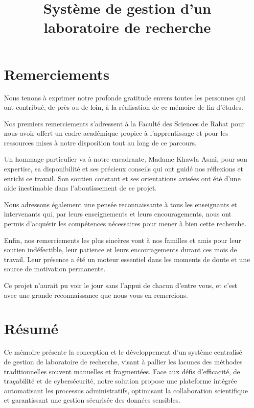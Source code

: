 \documentclass{rapportPfe}
\title{Système de gestion d'un laboratoire de recherche}
\begin{document}

\fairemarges
\fairepagedegarde


\chapter*{Remerciements}
Nous tenons à exprimer notre profonde gratitude envers toutes les personnes qui ont contribué, de près ou de loin, à la réalisation de ce mémoire de fin d’études.

Nos premiers remerciements s’adressent à la Faculté des Sciences de Rabat pour nous avoir offert un cadre académique propice à l’apprentissage et pour les ressources mises à notre disposition tout au long de ce parcours.

Un hommage particulier va à notre encadrante, Madame Khawla Asmi, pour son expertise, sa disponibilité et ses précieux conseils qui ont guidé nos réflexions et enrichi ce travail. Son soutien constant et ses orientations avisées ont été d’une aide inestimable dans l’aboutissement de ce projet.

Nous adressons également une pensée reconnaissante à tous les enseignants et intervenants qui, par leurs enseignements et leurs encouragements, nous ont permis d’acquérir les compétences nécessaires pour mener à bien cette recherche.

Enfin, nos remerciements les plus sincères vont à nos familles et amis pour leur soutien indéfectible, leur patience et leurs encouragements durant ces mois de travail. Leur présence a été un moteur essentiel dans les moments de doute et une source de motivation permanente.

Ce projet n’aurait pu voir le jour sans l’appui de chacun d’entre vous, et c’est avec une grande reconnaissance que nous vous en remercions.

\chapter*{Résumé}
Ce mémoire présente la conception et le développement d’un système centralisé de gestion de laboratoire de recherche, visant à pallier les lacunes des méthodes traditionnelles souvent manuelles et fragmentées. Face aux défis d’efficacité, de traçabilité et de cybersécurité, notre solution propose une plateforme intégrée automatisant les processus administratifs, optimisant la collaboration scientifique et garantissant une gestion sécurisée des données sensibles.
\end{document}
